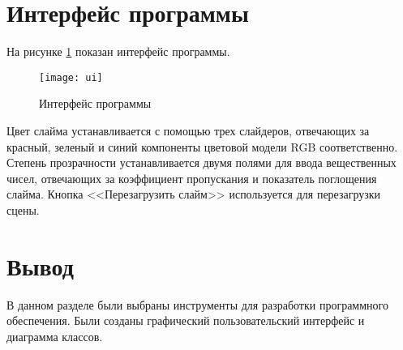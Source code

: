 \section{Интерфейс программы}

На рисунке \ref{ui} показан интерфейс программы.

\begin{figure}[H]
	\centering
	\texttt{[image: ui]}
	\caption{Интерфейс программы}
	\label{ui}
\end{figure}

Цвет слайма устанавливается с помощью трех слайдеров, отвечающих за красный, зеленый и синий компоненты цветовой модели RGB соответственно. Степень прозрачности устанавливается двумя полями для ввода вещественных чисел, отвечающих за коэффициент пропускания и показатель поглощения слайма. Кнопка <<Перезагрузить слайм>> используется для перезагрузки сцены.

\section*{Вывод}

В данном разделе были выбраны инструменты для разработки программного обеспечения. Были созданы графический пользовательский интерфейс и диаграмма классов.

\clearpage
